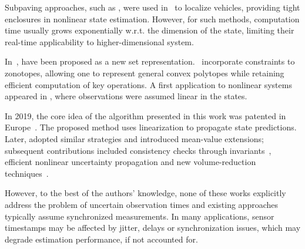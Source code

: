 \documentclass{ifacconf}
\begin{document}
Subpaving approaches, such as \sivia, were used in~\cite{bonnifait2017cooperative} to localize vehicles, providing tight enclosures in nonlinear state estimation.
However, for such methods, computation time usually grows exponentially w.r.t. the dimension of the state, limiting their real-time applicability to higher-dimensional system.


In~\cite{scott2016constrained}, \czs{} have been proposed as a new set representation.
\czs\ incorporate constraints to zonotopes, allowing one to represent general convex polytopes while retaining efficient computation of key operations.
A first application to nonlinear systems appeared in \cite{rego2018set}, where observations were assumed linear in the states.%

In 2019, the core idea of the algorithm presented in this work was patented in Europe~\citep{patent_CZESMF}.
The proposed method uses linearization to propagate state predictions. %
Later, \cite{RegoEtAl2020} adopted similar strategies and introduced mean-value extensions; subsequent contributions included consistency checks through invariants~\citep{RegoEtAl2021},
efficient nonlinear uncertainty propagation %
\citep{facerias2024distributed} and new volume-reduction techniques~\citep{rego2025novel}.


However, to the best of the authors' knowledge, none of these works explicitly address the problem of uncertain observation times and existing approaches typically assume synchronized measurements. 
In many applications, sensor timestamps may be affected by jitter, delays or synchronization issues, which may degrade estimation performance, if not accounted for.
\end{document}
